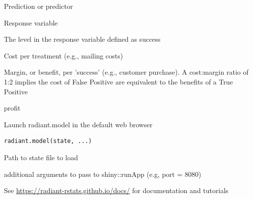 \documentclass[a4paper]{book}
\begin{document}
\begin{Arguments}
\begin{ldescription}
\item[\code{pred}] Prediction or predictor

\item[\code{rvar}] Response variable

\item[\code{lev}] The level in the response variable defined as success

\item[\code{cost}] Cost per treatment (e.g., mailing costs)

\item[\code{margin}] Margin, or benefit, per 'success' (e.g., customer purchase). A cost:margin ratio of 1:2 implies
the cost of False Positive are equivalent to the benefits of a True Positive
\end{ldescription}
\end{Arguments}
%
\begin{Value}
profit
\end{Value}
%
\begin{Examples}
\end{Examples}
%
\begin{Description}
Launch radiant.model in the default web browser
\end{Description}
%
\begin{Usage}
\begin{verbatim}
radiant.model(state, ...)
\end{verbatim}
\end{Usage}
%
\begin{Arguments}
\begin{ldescription}
\item[\code{state}] Path to state file to load

\item[\code{...}] additional arguments to pass to shiny::runApp (e.g, port = 8080)
\end{ldescription}
\end{Arguments}
%
\begin{Details}
See \url{https://radiant-rstats.github.io/docs/} for documentation and tutorials
\end{Details}
\end{document}
